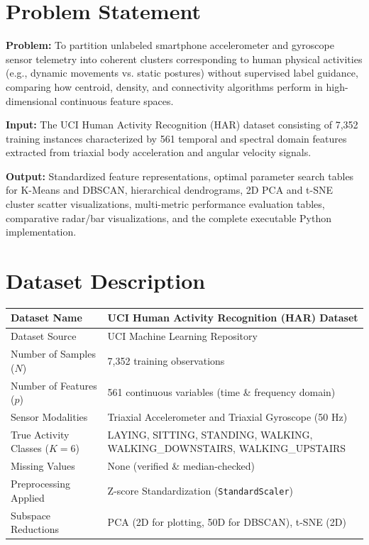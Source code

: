 \documentclass[12pt,a4paper]{article}
\begin{document}
\section{Problem Statement}
\textbf{Problem:} To partition unlabeled smartphone accelerometer and gyroscope sensor telemetry into coherent clusters corresponding to human physical activities (e.g., dynamic movements vs. static postures) without supervised label guidance, comparing how centroid, density, and connectivity algorithms perform in high-dimensional continuous feature spaces.

\textbf{Input:} The UCI Human Activity Recognition (HAR) dataset consisting of 7,352 training instances characterized by 561 temporal and spectral domain features extracted from triaxial body acceleration and angular velocity signals.

\textbf{Output:} Standardized feature representations, optimal parameter search tables for K-Means and DBSCAN, hierarchical dendrograms, 2D PCA and t-SNE cluster scatter visualizations, multi-metric performance evaluation tables, comparative radar/bar visualizations, and the complete executable Python implementation.

\section{Dataset Description}
\begin{longtable}{|p{6cm}|p{8cm}|}
\hline
Dataset Name & UCI Human Activity Recognition (HAR) Dataset\\ \hline
Dataset Source & UCI Machine Learning Repository\\ \hline
Number of Samples ($N$) & 7,352 training observations\\ \hline
Number of Features ($p$) & 561 continuous variables (time \& frequency domain)\\ \hline
Sensor Modalities & Triaxial Accelerometer and Triaxial Gyroscope (50 Hz)\\ \hline
True Activity Classes ($K=6$) & LAYING, SITTING, STANDING, WALKING, WALKING\_DOWNSTAIRS, WALKING\_UPSTAIRS\\ \hline
Missing Values & None (verified \& median-checked)\\ \hline
Preprocessing Applied & Z-score Standardization (\texttt{StandardScaler})\\ \hline
Subspace Reductions & PCA (2D for plotting, 50D for DBSCAN), t-SNE (2D)\\ \hline
\end{longtable}
\end{document}

